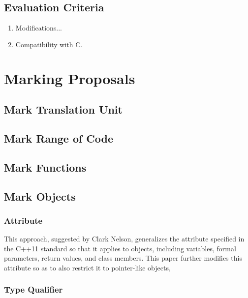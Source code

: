 \documentclass[letterpaper,twocolumn,10pt]{article}
\begin{document}
\subsection{Evaluation Criteria}
\label{sec:Evaluation Criteria}

\begin{enumerate}
\item	Modifications...
\item	Compatibility with C.
\end{enumerate}

\section{Marking Proposals}
\label{sec:Marking Proposals}

\subsection{Mark Translation Unit}
\label{sec:Mark Translation Unit}

\subsection{Mark Range of Code}
\label{sec:Mark Range of Code}

\subsection{Mark Functions}
\label{sec:Mark Functions}

\subsection{Mark Objects}
\label{sec:Mark Objects}

\subsubsection{Attribute}
\label{sec:Attribute}

This approach, suggested by Clark Nelson, generalizes the
 attribute specified in the C++11 standard
so that it applies to objects, including variables, formal parameters,
return values, and class members.
This paper further modifies this attribute so as to also restrict
it to pointer-like objects,

\subsubsection{Type Qualifier}
\label{sec:Type Qualifier}
\end{document}
